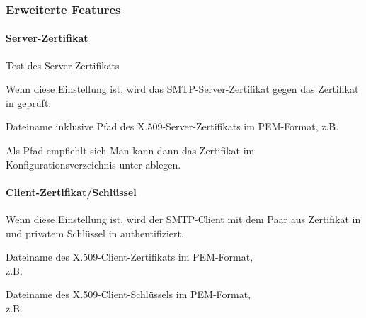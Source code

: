 \subsubsection {Erweiterte Features}

\paragraph {Server-Zertifikat}
Test des Server-Zertifikats

\begin {description}
    

    Wenn diese Einstellung  ist, wird das SMTP-Server-Zertifikat 
    gegen das Zertifikat in 
    geprüft.

    
    Dateiname inklusive Pfad des X.509-Server-Zertifikats im PEM-Format,
    z.B. 
    
    Als Pfad empfiehlt sich 
    Man kann dann das Zertifikat im Konfigurationsverzeichnis unter
     ablegen.

\end {description}

\paragraph {Client-Zertifikat/Schlüssel}
\begin {description}


    Wenn diese Einstellung  ist, wird der SMTP-Client mit dem Paar
    aus Zertifikat in 
    und privatem Schlüssel in 
    authentifiziert. 

    
    
    Dateiname des X.509-Client-Zertifikats im PEM-Format, \\
    z.B. 

    
    Dateiname des X.509-Client-Schlüssels im PEM-Format, \\
    z.B. 
    
\end {description}

